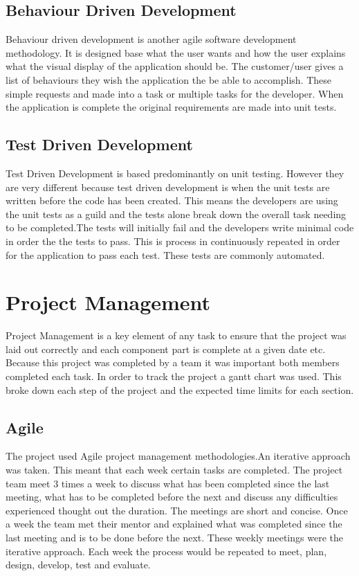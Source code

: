 \subsection{Behaviour Driven Development}

Behaviour driven development is another agile software development methodology. It is designed base what the user wants and how the user explains what the visual display of the application should be. The customer/user gives a list of behaviours they wish the application the be able to accomplish. These simple requests and made into a task or multiple tasks for the developer. When the application is complete the original requirements are made into unit tests.\cite{BDD} 

\subsection{Test Driven Development}

Test Driven Development is based predominantly on unit testing. However they are very different because test driven development is when the unit tests are written before the code has been created. This means the developers are using the unit tests as a guild and the tests alone break down the overall task needing to be completed.The tests will initially fail and the developers write minimal code in order the the tests to pass. This is process in continuously repeated in order for the application to pass each test. These tests are commonly automated.\cite{TDD}

\section{Project Management}

Project Management is a key element of any task to ensure that the project was laid out correctly and each component part is complete at a given date etc. Because this project was completed by a team it was important both members completed each task. In order to track the project a gantt chart was used. This broke down each step of the project and the expected time limits for each section.

\subsection{Agile}

The project used Agile project management methodologies.An iterative approach was taken. This meant that each week certain tasks are completed. The project team meet 3 times a week to discuss what has been completed since the last meeting, what has to be completed before the next and discuss any  difficulties experienced thought out the duration. The meetings are short and concise. Once a week the team met their mentor and explained what was completed since the last meeting and is to be done before the next. These weekly meetings were the iterative approach. Each week the process would be repeated to meet, plan, design, develop, test and evaluate.

